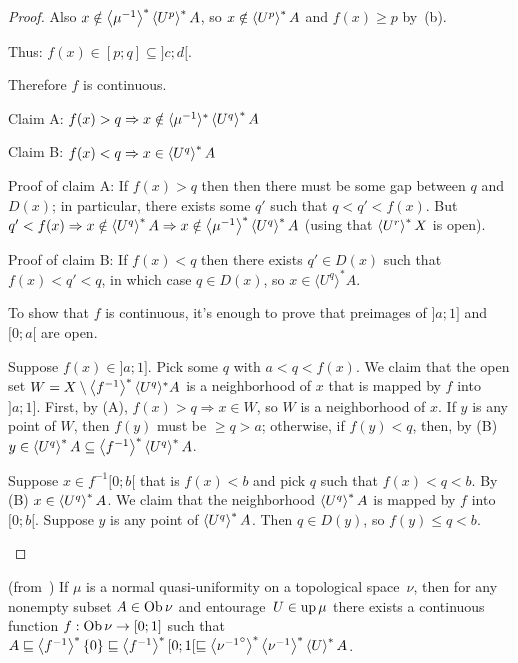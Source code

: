 \begin{proof}
Also $x\notin\left\langle \mu^{-1}\right\rangle ^{\ast}\left\langle U^p\right\rangle ^{\ast}A$, so $x\notin\left\langle U^p\right\rangle ^{\ast}A$ and $f(x)\geq p$ by~(b).

Thus: $f(x)\in[p;q]\subseteq]c;d[$.

Therefore $f$ is continuous.

\begin{grayed}
Claim A: $f (x) > q \Rightarrow x \notin \langle \mu^{- 1}
\rangle^{\ast} \left\langle U^q\right\rangle ^{\ast} A$

Claim B: $f (x) < q \Rightarrow x \in \left\langle U^q\right\rangle ^{\ast} A$

Proof of claim A: If $f (x) > q$ then then there must be some gap between $q$
and $D (x)$; in particular, there exists some $q'$ such that $q < q' < f (x)$.
But $q' < f (x) \Rightarrow x \notin \left\langle U^q\right\rangle ^{\ast} A \Rightarrow x
\notin \left\langle \mu^{- 1}\right\rangle ^{\ast} \left\langle U^q\right\rangle ^{\ast} A$ (using that $\left\langle U^r\right\rangle ^{\ast}X$ is open).

Proof of claim B: If $f (x) < q$ then there exists $q' \in D (x)$ such that $f
(x) < q' < q$, in which case $q \in D (x)$, so $x \in \langle U^q
\rangle^{\ast} A$.

To show that $f$ is continuous, it's enough to prove that preimages of $] a ;
1]$ and $[0 ; a [$ are open.

Suppose $f (x) \in] a ; 1]$. Pick some $q$ with $a < q < f (x)$. We claim that
the open set $W = X \setminus \left\langle f^{- 1}\right\rangle ^{\ast} \langle U^q
\rangle^{\ast} A$ is a neighborhood of $x$ that is mapped by $f$ into $] a ;
1]$. First, by (A), $f (x) > q \Rightarrow x \in W$, so $W$ is a neighborhood
of $x$. If $y$ is any point of $W$, then $f (y)$ must be $\geq q > a$;
otherwise, if $f (y) < q$, then, by (B) $y \in \left\langle U^q\right\rangle ^{\ast} A
\subseteq \left\langle f^{- 1}\right\rangle ^{\ast} \left\langle U^q\right\rangle ^{\ast} A$.

Suppose $x \in f^{- 1} [0 ; b [$ that is $f (x) < b$ and pick $q$ such that $f
(x) < q < b$. By (B) $x \in \left\langle U^q\right\rangle ^{\ast} A$. We claim that the
neighborhood $\left\langle U^q\right\rangle ^{\ast} A$ is mapped by $f$ into $[0 ; b [$.
Suppose $y$ is any point of $\left\langle U^q\right\rangle ^{\ast} A$. Then $q \in D
(y)$, so $f (y) \leq q < b$.
\end{grayed}
\end{proof}

\begin{thm}
(from~\cite{2014arXiv1410.1504B})
If $\mu$ is a normal quasi-uniformity on a topological space~$\nu$, then for any nonempty subset $A\in\operatorname{Ob}\nu$
and entourage~$U\in\operatorname{up}\mu$ there exists a continuous function $f:\operatorname{Ob}\nu\rightarrow[0;1]$ such that
$A\sqsubseteq\left\langle f^{-1}\right\rangle ^{\ast}\{0\}\sqsubseteq\left\langle f^{-1}\right\rangle ^{\ast}[0;1[\sqsubseteq\left\langle {\nu^{-1}}^\circ\right\rangle ^{\ast}\left\langle \nu^{-1}\right\rangle ^{\ast}\left\langle U\right\rangle ^{\ast}A$.
\end{thm}

